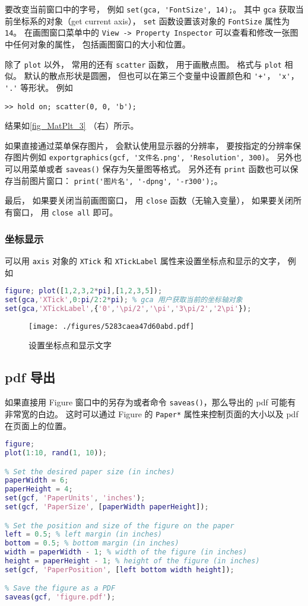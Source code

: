 要改变当前窗口中的字号， 例如 \verb`set(gca, 'FontSize', 14);`。 其中 \verb`gca` 获取当前坐标系的对象（get current axis）， \verb`set` 函数设置该对象的 \verb`FontSize` 属性为 \verb`14`。 在画图窗口菜单中的 \verb`View -> Property Inspector` 可以查看和修改一张图中任何对象的属性， 包括画图窗口的大小和位置。

除了 \verb`plot` 以外， 常用的还有 \verb`scatter` 函数， 用于画散点图。 格式与 \verb`plot` 相似。 默认的散点形状是圆圈， 但也可以在第三个变量中设置颜色和 \verb`'+'`， \verb`'x'`， \verb`'.'` 等形状。 例如
\begin{lstlisting}[language=matlabC]
>> hold on; scatter(0, 0, 'b');
\end{lstlisting}
结果如\autoref{fig_MatPlt_3} （右）所示。

如果直接通过菜单保存图片， 会默认使用显示器的分辨率， 要按指定的分辨率保存图片例如 \verb`exportgraphics(gcf, '文件名.png', 'Resolution', 300)`。 另外也可以用菜单或者 \verb`saveas()` 保存为矢量图等格式。 另外还有 \verb`print` 函数也可以保存当前图片窗口： \verb`print('图片名', '-dpng', '-r300');`。

最后， 如果要关闭当前画图窗口， 用 \verb`close` 函数（无输入变量）， 如果要关闭所有窗口， 用 \verb`close all` 即可。

\subsubsection{坐标显示}
可以用 \verb`axis` 对象的 \verb`XTick` 和 \verb`XTickLabel` 属性来设置坐标点和显示的文字， 例如 
\begin{lstlisting}[language=matlab]
figure; plot([1,2,3,2*pi],[1,2,3,5]);
set(gca,'XTick',0:pi/2:2*pi); % gca 用户获取当前的坐标轴对象
set(gca,'XTickLabel',{'0','\pi/2','\pi','3\pi/2','2\pi'});
\end{lstlisting}
\begin{figure}[ht]
\centering
\texttt{[image: ./figures/5283caea47d60abd.pdf]}
\caption{设置坐标点和显示文字} \label{fig_MatPlt_4}
\end{figure}

\subsection{pdf 导出}
如果直接用 Figure 窗口中的另存为或者命令 \verb`saveas()`，那么导出的 pdf 可能有非常宽的白边。 这时可以通过 Figure 的 \verb`Paper*` 属性来控制页面的大小以及 pdf 在页面上的位置。
\begin{lstlisting}[language=matlab]
figure;
plot(1:10, rand(1, 10));

% Set the desired paper size (in inches)
paperWidth = 6;
paperHeight = 4;
set(gcf, 'PaperUnits', 'inches');
set(gcf, 'PaperSize', [paperWidth paperHeight]);

% Set the position and size of the figure on the paper
left = 0.5; % left margin (in inches)
bottom = 0.5; % bottom margin (in inches)
width = paperWidth - 1; % width of the figure (in inches)
height = paperHeight - 1; % height of the figure (in inches)
set(gcf, 'PaperPosition', [left bottom width height]);

% Save the figure as a PDF
saveas(gcf, 'figure.pdf');
\end{lstlisting}
